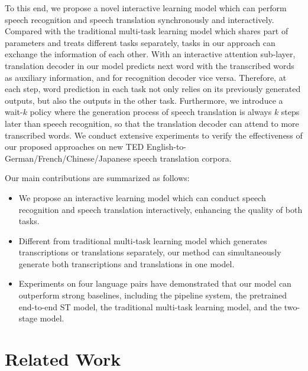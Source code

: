 \documentclass[letterpaper]{article} %
\begin{document}
To this end, we propose a novel interactive learning model which can perform speech recognition and speech translation synchronously and interactively. Compared with the traditional multi-task learning model which shares part of parameters and treats different tasks separately, tasks in our approach can exchange the information of each other. With an interactive attention sub-layer, translation decoder in our model predicts next word with the transcribed words as auxiliary information, and for recognition decoder vice versa. Therefore, at each step, word prediction in  each task not only relies on its previously generated outputs, but also the outputs in the other task. 
Furthermore, we introduce a wait-$k$ policy where the generation process of speech translation is always $k$ steps later than speech recognition, so that the translation decoder can attend to more transcribed words. 
We conduct extensive experiments to verify the effectiveness of our proposed approaches on new TED English-to-German/French/Chinese/Japanese speech translation corpora. 

Our main contributions are summarized as follows:
\begin{itemize}
	\item We propose an interactive learning model which can conduct speech recognition and speech translation interactively, enhancing the quality of both tasks. 
	\item Different from traditional multi-task learning model which generates transcriptions or translations separately, our method can simultaneously generate both transcriptions and translations in one model. 
	\item Experiments on four language pairs have demonstrated that our model can outperform strong baselines, including the pipeline system, the pretrained end-to-end ST model, the traditional multi-task learning model, and the two-stage model.
\end{itemize}

\section{Related Work}
\end{document}
